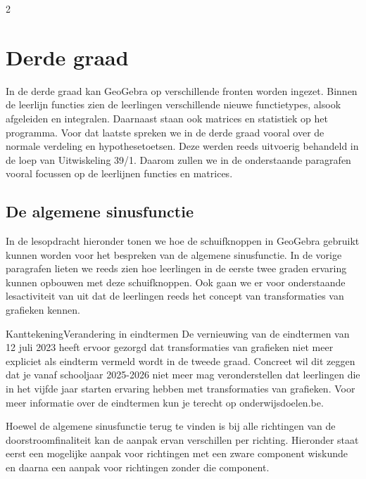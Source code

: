 \begin{multicols}{2}

\section{Derde graad}
In de derde graad kan GeoGebra op verschillende fronten worden ingezet. Binnen de leerlijn functies zien de leerlingen verschillende nieuwe functietypes, alsook afgeleiden en integralen. Daarnaast staan ook matrices en statistiek op het programma. Voor dat laatste spreken we in de derde graad vooral over de normale verdeling en hypothesetoetsen. Deze werden reeds uitvoerig behandeld in de loep van Uitwiskeling 39/1. Daarom zullen we in de onderstaande paragrafen vooral focussen op de leerlijnen functies en matrices.

\subsection{De algemene sinusfunctie}
In de lesopdracht hieronder tonen we hoe de schuifknoppen in GeoGebra gebruikt kunnen worden voor het bespreken van de algemene sinusfunctie. In de vorige paragrafen lieten we reeds zien hoe leerlingen in de eerste twee graden ervaring kunnen opbouwen met deze schuifknoppen. Ook gaan we er voor onderstaande lesactiviteit van uit dat de leerlingen reeds het concept van transformaties van grafieken kennen.



\begin{kader}{Kanttekening}{Verandering in eindtermen}
De vernieuwing van de eindtermen van 12 juli 2023 heeft ervoor gezorgd dat transformaties van grafieken niet meer expliciet als eindterm vermeld wordt in de tweede graad. Concreet wil dit zeggen dat je vanaf schooljaar 2025-2026 niet meer mag veronderstellen dat leerlingen die in het vijfde jaar starten ervaring hebben met transformaties van grafieken. Voor meer informatie over de eindtermen kun je terecht op onderwijsdoelen.be.
\end{kader}

Hoewel de algemene sinusfunctie terug te vinden is bij alle richtingen van de doorstroomfinaliteit kan de aanpak ervan verschillen per richting. Hieronder staat eerst een mogelijke aanpak voor richtingen met een zware component wiskunde en daarna een aanpak voor richtingen zonder die component.
\end{multicols}

